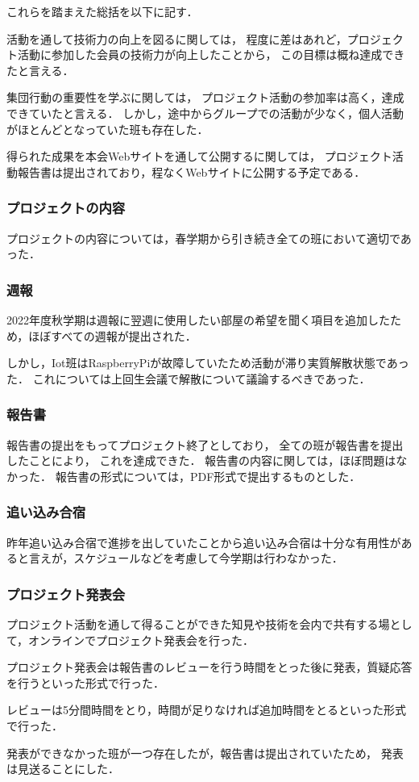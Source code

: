 これらを踏まえた総括を以下に記す．

活動を通して技術力の向上を図るに関しては，
程度に差はあれど，プロジェクト活動に参加した会員の技術力が向上したことから，
この目標は概ね達成できたと言える．

集団行動の重要性を学ぶに関しては，
プロジェクト活動の参加率は高く，達成できていたと言える．
しかし，途中からグループでの活動が少なく，個人活動がほとんどとなっていた班も存在した．

得られた成果を本会Webサイトを通して公開するに関しては，
プロジェクト活動報告書は提出されており，程なくWebサイトに公開する予定である．

\subsubsection*{プロジェクトの内容}
プロジェクトの内容については，春学期から引き続き全ての班において適切であった．

\subsubsection*{週報}
2022年度秋学期は週報に翌週に使用したい部屋の希望を聞く項目を追加したため，ほぼすべての週報が提出された．

しかし，Iot班はRaspberryPiが故障していたため活動が滞り実質解散状態であった．
これについては上回生会議で解散について議論するべきであった．

\subsubsection*{報告書}

報告書の提出をもってプロジェクト終了としており，
全ての班が報告書を提出したことにより，
これを達成できた．
報告書の内容に関しては，ほぼ問題はなかった．
報告書の形式については，PDF形式で提出するものとした．

\subsubsection*{追い込み合宿}
昨年追い込み合宿で進捗を出していたことから追い込み合宿は十分な有用性があると言えが，スケジュールなどを考慮して今学期は行わなかった．

\subsubsection*{プロジェクト発表会}

プロジェクト活動を通して得ることができた知見や技術を会内で共有する場として，オンラインでプロジェクト発表会を行った．

プロジェクト発表会は報告書のレビューを行う時間をとった後に発表，質疑応答を行うといった形式で行った．

レビューは5分間時間をとり，時間が足りなければ追加時間をとるといった形式で行った．

発表ができなかった班が一つ存在したが，報告書は提出されていたため，
発表は見送ることにした．
